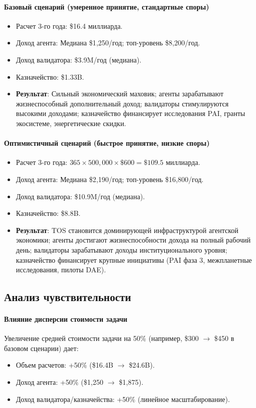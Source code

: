 \documentclass[11pt]{article}
\begin{document}
\paragraph{Базовый сценарий (умеренное принятие, стандартные споры)}
\begin{itemize}[noitemsep]
  \item Расчет 3-го года: \$16.4 миллиарда.
  \item Доход агента: Медиана \$1{,}250/год; топ-уровень \$8{,}200/год.
  \item Доход валидатора: \$3.9M/год (медиана).
  \item Казначейство: \$1.33B.
  \item \textbf{Результат}: Сильный экономический маховик; агенты зарабатывают жизнеспособный дополнительный доход; валидаторы стимулируются высокими доходами; казначейство финансирует исследования PAI, гранты экосистеме, энергетические скидки.
\end{itemize}

\paragraph{Оптимистичный сценарий (быстрое принятие, низкие споры)}
\begin{itemize}[noitemsep]
  \item Расчет 3-го года: $365 \times 500{,}000 \times \$600 = \$109.5$ миллиарда.
  \item Доход агента: Медиана \$2{,}190/год; топ-уровень \$16{,}800/год.
  \item Доход валидатора: \$10.9M/год (медиана).
  \item Казначейство: \$8.8B.
  \item \textbf{Результат}: TOS становится доминирующей инфраструктурой агентской экономики; агенты достигают жизнеспособности дохода на полный рабочий день; валидаторы зарабатывают доходы институционального уровня; казначейство финансирует крупные инициативы (PAI фаза 3, межпланетные исследования, пилоты DAE).
\end{itemize}

\subsection{Анализ чувствительности}
\paragraph{Влияние дисперсии стоимости задачи}
Увеличение средней стоимости задачи на 50\% (например, \$300 $\to$ \$450 в базовом сценарии) дает:
\begin{itemize}[noitemsep]
  \item Объем расчетов: +50\% (\$16.4B $\to$ \$24.6B).
  \item Доход агента: +50\% (\$1{,}250 $\to$ \$1{,}875).
  \item Доход валидатора/казначейства: +50\% (линейное масштабирование).
\end{itemize}
\end{document}
